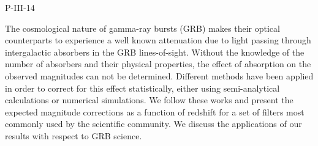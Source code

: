 P-III-14


\bigskip



\bigskip

\noindent The cosmological nature of gamma-ray bursts (GRB) makes their optical counterparts to experience a well known attenuation due to light passing through intergalactic absorbers in the GRB lines-of-sight. Without the knowledge of the number of absorbers and their physical properties, the effect of absorption on the observed magnitudes can not be determined. Different methods have been applied in order to correct for this effect statistically, either using semi-analytical calculations or numerical simulations. We follow these works and present the expected magnitude corrections as a function of redshift for a set of filters most commonly used by the scientific community. We discuss the applications of our results with respect to GRB science.

